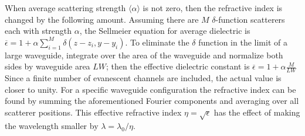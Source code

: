 When average scattering strength $\langle \alpha \rangle$ is not zero, then the refractive index is changed by the following amount. Assuming there are $M$ $\delta$-function scatterers each with strength $\alpha$, the Sellmeier equation for average dielectric is
$\overline{\epsilon} = 1+\alpha \sum_{i=1}^M \delta(z-z_i,y-y_i)$.
To eliminate the $\delta$ function in the limit of a large waveguide, integrate over the area of the waveguide and 
normalize both sides by waveguide area $LW$; then the effective dielectric constant is 
$\overline{\epsilon} = 1 + \alpha \frac{M}{LW}$
Since a finite number of evanescent channels are included, the actual value is closer to unity. For a specific waveguide configuration the refractive index can be found by summing the aforementioned Fourier components and averaging over all scatterer positions. This effective refractive index $\eta=\sqrt{\epsilon}$ has the effect of making the wavelength smaller by $\lambda = \lambda_0/\eta$. 


